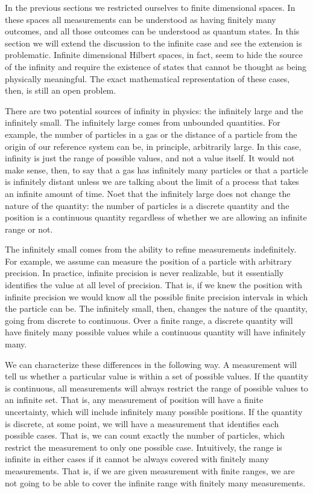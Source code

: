In the previous sections we restricted ourselves to finite dimensional spaces. In these spaces all measurements can be understood as having finitely many outcomes, and all those outcomes can be understood as quantum states. In this section we will extend the discussion to the infinite case and see the extension is problematic. Infinite dimensional Hilbert spaces, in fact, seem to hide the source of the infinity and require the existence of states that cannot be thought as being physically meaningful. The exact mathematical representation of these cases, then, is still an open problem.

There are two potential sources of infinity in physics: the infinitely large and the infinitely small. The infinitely large comes from unbounded quantities. For example, the number of particles in a gas or the distance of a particle from the origin of our reference system can be, in principle, arbitrarily large. In this case, infinity is just the range of possible values, and not a value itself. It would not make sense, then, to say that a gas has infinitely many particles or that a particle is infinitely distant unless we are talking about the limit of a process that takes an infinite amount of time. Noet that the infinitely large does not change the nature of the quantity: the number of particles is a discrete quantity and the position is a continuous quantity regardless of whether we are allowing an infinite range or not.

The infinitely small comes from the ability to refine measurements indefinitely. For example, we assume can measure the position of a particle with arbitrary precision. In practice, infinite precision is never realizable, but it essentially identifies the value at all level of precision. That is, if we knew the position with infinite precision we would know all the possible finite precision intervals in which the particle can be. The infinitely small, then, changes the nature of the quantity, going from discrete to continuous. Over a finite range, a discrete quantity will have finitely many possible values while a continuous quantity will have infinitely many.

We can characterize these differences in the following way. A measurement will tell us whether a particular value is within a set of possible values. If the quantity is continuous, all measurements will always restrict the range of possible values to an infinite set. That is, any measurement of position will have a finite uncertainty, which will include infinitely many possible positions. If the quantity is discrete, at some point, we will have a measurement that identifies each possible cases. That is, we can count exactly the number of particles, which restrict the measurement to only one possible case. Intuitively, the range is infinite in either cases if it cannot be always covered with finitely many measurements. That is, if we are given measurement with finite ranges, we are not going to be able to cover the infinite range with finitely many measurements.

